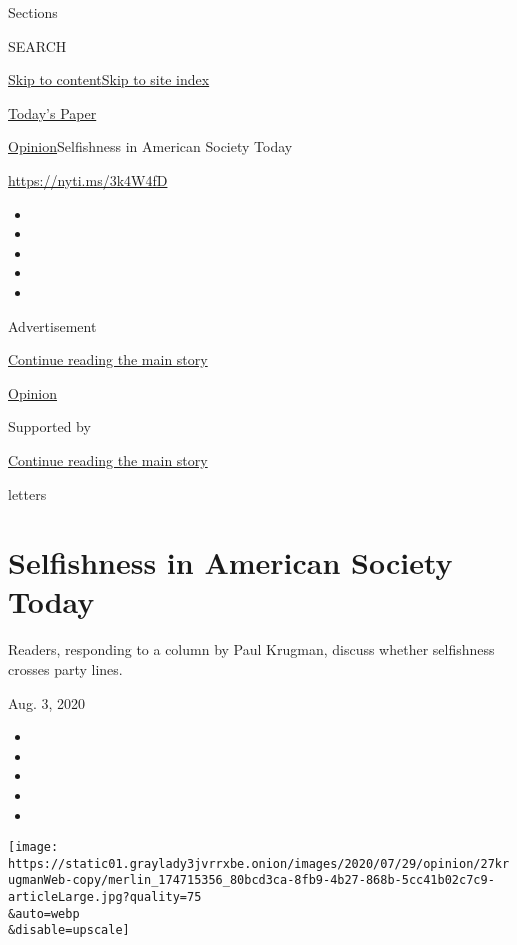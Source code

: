 Sections

SEARCH

\protect\hyperlink{site-content}{Skip to
content}\protect\hyperlink{site-index}{Skip to site index}

\href{https://myaccount.nytimes3xbfgragh.onion/auth/login?response_type=cookie\&client_id=vi}{}

\href{https://www.nytimes3xbfgragh.onion/section/todayspaper}{Today's
Paper}

\href{/section/opinion}{Opinion}\textbar{}Selfishness in American
Society Today

\url{https://nyti.ms/3k4W4fD}

\begin{itemize}
\item
\item
\item
\item
\item
\end{itemize}

Advertisement

\protect\hyperlink{after-top}{Continue reading the main story}

\href{/section/opinion}{Opinion}

Supported by

\protect\hyperlink{after-sponsor}{Continue reading the main story}

letters

\hypertarget{selfishness-in-american-society-today}{%
\section{Selfishness in American Society
Today}\label{selfishness-in-american-society-today}}

Readers, responding to a column by Paul Krugman, discuss whether
selfishness crosses party lines.

Aug. 3, 2020

\begin{itemize}
\item
\item
\item
\item
\item
\end{itemize}

\texttt{[image: https://static01.graylady3jvrrxbe.onion/images/2020/07/29/opinion/27krugmanWeb-copy/merlin\_174715356\_80bcd3ca-8fb9-4b27-868b-5cc41b02c7c9-articleLarge.jpg?quality=75\\\&auto=webp\\\&disable=upscale]}

